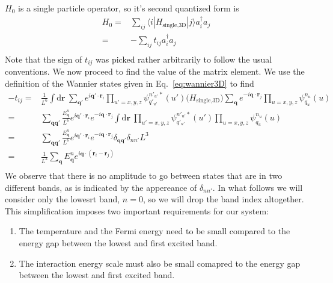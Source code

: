 \documentclass[oneside,11pt]{memoir}
\newcommand{\bv}[1]{\ensuremath{\bm{#1}}}
\begin{document}
$H_{0}$ is a single particle operator, so it's second quantized form is 
\begin{equation}
\begin{split}
  H_{0} = & \sum_{ij} \langle i| H_{\text{single,3D}} |j \rangle a_{i}^{\dagger} a_{j} \\
        = & -\sum_{ij} t_{ij}  a_{i}^{\dagger} a_{j} \\
\end{split}
\end{equation}  
Note that the sign of $t_{ij}$ was picked rather arbitrarily to follow the
usual conventions.  We now proceed to find the value of the matrix element.
We use the definition of the Wannier states given in Eq.~\ref{eq:wannier3D} to
find 
\begin{equation}
\begin{split}
-t_{ij}  
= & 
  \frac{1}{L^{6}}\int \mathrm{d}\bv{r}\ 
     \sum_{\bv{q}'} e^{i \bv{q'}\cdot\bv{r}_{i} }
     \prod_{u'=x,y,z}  \psi_{q'_{u'}}^{n'_{u'}*}(u') 
  \Big( H_{\text{single,3D}}  \Big)
     \sum_{\bv{q}} e^{-i \bv{q}\cdot\bv{r}_{j} }
     \prod_{u=x,y,z}  \psi_{q_{u}}^{n_{u}}(u)\\ 
= &
  \sum_{\bv{q}\bv{q}'}   
  \frac{E_{\bv{q}}^{n}}{L^{6}}
   e^{ i \bv{q}'\cdot\bv{r}_{i} }  e^{ -i \bv{q}\cdot\bv{r}_{j} }
   \int\mathrm{d}\bv{r}\ 
     \prod_{u'=x,y,z}  \psi_{q'_{u'}}^{n'_{u'}*}(u') 
     \prod_{u=x,y,z}  \psi_{q_{u}}^{n_{u}}(u) \\ 
= &
  \sum_{\bv{q}\bv{q}'}   
  \frac{E_{\bv{q}}^{n}}{L^{6}}
   e^{ i \bv{q}'\cdot\bv{r}_{i} }  e^{ -i \bv{q}\cdot\bv{r}_{j} }
   \delta_{\bv{q}\bv{q}'} \delta_{nn'} L^{3} \\
= &
  \frac{1}{L^{3}}
  \sum_{\bv{q}}   E_{\bv{q}}^{n}
   e^{ i \bv{q}\cdot(\bv{r}_{i} - \bv{r}_{j}) } \\
\end{split} 
\end{equation}
We observe that there is no amplitude to go between states that are in two
different bands, as is indicated by the appereance of $\delta_{nn'}$.   In what
follows we will consider only the lowesrt band, $n=0$,  so we will drop the
band index altogether.  This simplification imposes two important requirements
for our system: 
\begin{enumerate}
\item The temperature and the Fermi energy need to be small compared to the
energy gap between the lowest and first excited band.   
\item The interaction energy scale must also be small comapred to the energy
gap between the lowest and first excited band. 
\end{enumerate}
\end{document}
